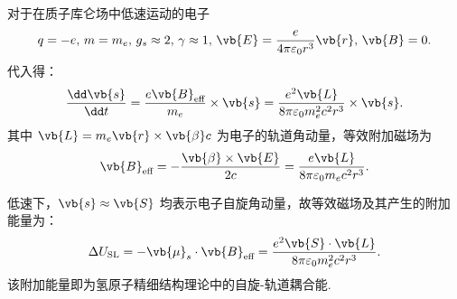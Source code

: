 \begin{exbox}
	对于在质子库仑场中低速运动的电子
	\begin{align*}
		q=-e,\,m=m_e,\,g_s\approx 2,\,\gamma \approx 1,\,\vb{E} = \dfrac{e}{4\pi\varepsilon_0 r^3}\vb{r},\,\vb{B} = 0.
	\end{align*}
	代入得：
	\begin{align*}
		\dfrac{\dd \vb{s}}{\dd t} = \dfrac{e \vb{B}_\text{eff}}{m_e} \times \vb{s} = \dfrac{e^2 \vb{L}}{8\pi\varepsilon_0 m_e^2 c^2 r^3} \times \vb{s}.
	\end{align*}
	其中 \(\vb{L} = m_e \vb{r} \times \vb{\beta} c\) 为电子的轨道角动量，等效附加磁场为
	\begin{align*}
		\vb{B}_\text{eff} = -\dfrac{\vb{\beta} \times \vb{E}}{2c} = \dfrac{e \vb{L}}{8\pi\varepsilon_0 m_e c^2 r^3}.
	\end{align*}

	低速下，\(\vb{s} \approx \vb{S}\) 均表示电子自旋角动量，故等效磁场及其产生的附加能量为：
	\begin{align*}
		\Delta U_{\text{SL}} = -\vb{\mu}_s \cdot \vb{B}_\text{eff} = \dfrac{e^2 \vb{S} \cdot \vb{L}}{8\pi\varepsilon_0 m_e^2 c^2 r^3}.
	\end{align*}
	该附加能量即为氢原子精细结构理论中的自旋-轨道耦合能.
\end{exbox}
